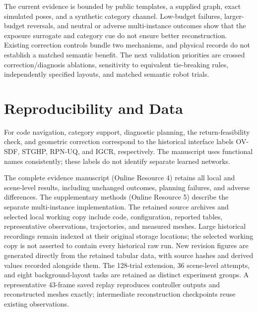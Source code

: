\documentclass[11pt,a4paper]{article}
\providecommand{\hypertarget}[2]{#2}
\begin{document}
The current evidence is bounded by public templates, a supplied graph, exact simulated poses, and a synthetic category channel. Low-budget failures, larger-budget reversals, and neutral or adverse multi-instance outcomes show that the exposure surrogate and category cue do not ensure better reconstruction. Existing correction controls bundle two mechanisms, and physical records do not establish a matched semantic benefit. The next validation priorities are crossed correction/diagnosis ablations, sensitivity to equivalent tie-breaking rules, independently specified layouts, and matched semantic robot trials.

\hypertarget{reproducibility-and-data}{%
\section{Reproducibility and Data}\label{reproducibility-and-data}}

For code navigation, category support, diagnostic planning, the return-feasibility check, and geometric correction correspond to the historical interface labels OV-SDF, STGHP, RPN-UQ, and IGCR, respectively. The manuscript uses functional names consistently; these labels do not identify separate learned networks.

The complete evidence manuscript (Online Resource 4) retains all local and scene-level results, including unchanged outcomes, planning failures, and adverse differences. The supplementary methods (Online Resource 5) describe the separate multi-instance implementation. The retained source archives and selected local working copy include code, configuration, reported tables, representative observations, trajectories, and measured meshes. Large historical recordings remain indexed at their original storage locations; the selected working copy is not asserted to contain every historical raw run. New revision figures are generated directly from the retained tabular data, with source hashes and derived values recorded alongside them. The 128-trial extension, 36 scene-level attempts, and eight background-layout tasks are retained as distinct experiment groups. A representative 43-frame saved replay reproduces controller outputs and reconstructed meshes exactly; intermediate reconstruction checkpoints reuse existing observations.
\end{document}
